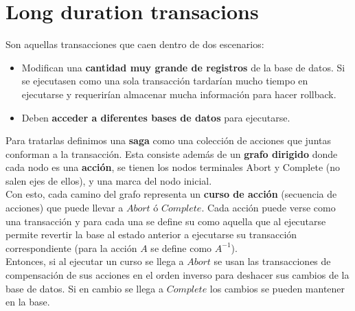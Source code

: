 \section*{Long duration transacions}
Son aquellas transacciones que caen dentro de dos escenarios:
\begin{itemize}
    \item Modifican una \textbf{cantidad muy grande de registros} de la base de datos. Si se ejecutasen como una sola transacción tardarían mucho tiempo en ejecutarse y requerirían almacenar mucha información para hacer rollback.
    \item Deben \textbf{acceder a diferentes bases de datos} para ejecutarse.
\end{itemize}
Para tratarlas definimos una \textbf{saga} como una colección de acciones que juntas conforman a la transacción. Esta consiste además de un \textbf{grafo dirigido} donde cada nodo es una \textbf{acción}, se tienen los nodos terminales Abort y Complete (no salen ejes de ellos), y una marca del nodo inicial. \\
Con esto, cada camino del grafo representa un \textbf{curso de acción} (secuencia de acciones) que puede llevar a $Abort$ ó $Complete$. Cada acción puede verse como una transacción y para cada una se define su  como aquella que al ejecutarse permite revertir la base al estado anterior a ejecutarse su transacción correspondiente (para la acción $A$ se define como $A^{-1}$). \\
Entonces, si al ejecutar un curso se llega a $Abort$ se usan las transacciones de compensación de sus acciones en el orden inverso para deshacer sus cambios de la base de datos. Si en cambio se llega a $Complete$ los cambios se pueden mantener en la base.